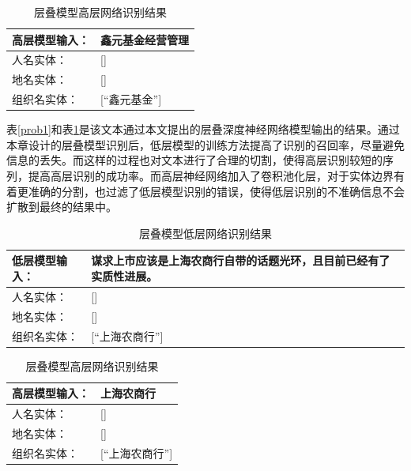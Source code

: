 \documentclass[winfonts,master,oneside,nobackinfo]{njuthesis}
\begin{document}
\begin{table}[h]
\centering
\begin{tabularx}{0.95\textwidth}{|l|X|}
\hline
高层模型输入： & 鑫元基金经营管理 \\ \hline
人名实体：             & {[}{]}                                                           \\ \hline
地名实体：             & {[}{]}                                                           \\ \hline
组织名实体：            & {[}“鑫元基金”{]}                   \\ \hline
\end{tabularx}
\caption{层叠模型高层网络识别结果}
\label{prob2}
\end{table}


表\ref{prob1}和表\ref{prob2}是该文本通过本文提出的层叠深度神经网络模型输出的结果。通过本章设计的层叠模型识别后，低层模型的训练方法提高了识别的召回率，尽量避免信息的丢失。而这样的过程也对文本进行了合理的切割，使得高层识别较短的序列，提高高层识别的成功率。而高层神经网络加入了卷积池化层，对于实体边界有着更准确的分割，也过滤了低层模型识别的错误，使得低层识别的不准确信息不会扩散到最终的结果中。

\begin{table}[h]
\centering
\begin{tabularx}{0.95\textwidth}{|l|X|}
\hline
低层模型输入： & 谋求上市应该是上海农商行自带的话题光环，且目前已经有了实质性进展。 \\ \hline
人名实体：             & {[}{]}                                                           \\ \hline
地名实体：             & {[}{]}                                                           \\ \hline
组织名实体：            & {[}“上海农商行”{]}                  \\ \hline
\end{tabularx}
\caption{层叠模型低层网络识别结果}
\label{solve-cascade1}
\end{table}

\begin{table}[h]
\centering
\begin{tabularx}{0.95\textwidth}{|l|X|}
\hline
高层模型输入： & 上海农商行 \\ \hline
人名实体：             & {[}{]}                                                           \\ \hline
地名实体：             & {[}{]}                                                           \\ \hline
组织名实体：            & {[}“上海农商行”{]}                   \\ \hline
\end{tabularx}
\caption{层叠模型高层网络识别结果}
\label{solve-cascade2}
\end{table}
\end{document}
